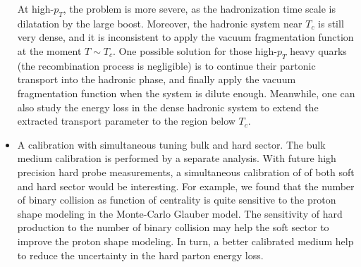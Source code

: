 \begin{itemize}
At high-$p_T$, the problem is more severe, as the hadronization time scale is dilatation by the large boost. 
Moreover, the hadronic system near $T_c$ is still very dense, and it is inconsistent to apply the vacuum fragmentation function at the moment $T\sim T_c$.
One possible solution for those high-$p_T$ heavy quarks (the recombination process is negligible) is to continue their partonic transport into the hadronic phase, and finally apply the vacuum fragmentation function when the system is dilute enough.
Meanwhile, one can also study the energy loss in the dense hadronic system to extend the extracted transport parameter to the region below $T_c$.
\item A calibration with simultaneous tuning bulk and hard sector. The bulk medium calibration is performed by a separate analysis. With future high precision hard probe measurements, a simultaneous calibration of of both soft and hard sector would be interesting.
For example, we found that the number of binary collision as function of centrality is quite sensitive to the proton shape modeling in the Monte-Carlo Glauber model. The sensitivity of hard production to the number of binary collision may help the soft sector to improve the proton shape modeling. In turn, a better calibrated medium help to reduce the uncertainty in the hard parton energy loss.
\end{itemize}